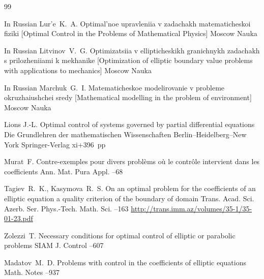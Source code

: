 \begin{thebibliography}{99}

\lang In Russian
\by Lur'e~K.~A.
\book Optimal'noe upravleniia v zadachakh matematicheskoi fiziki \rm [Optimal Control in the Problems of Mathematical Physics]
\publaddr Moscow
\publ Nauka


\lang In Russian
\by Litvinov~V.~G.
\book Optimizatsiia v ellipticheskikh granichnykh zadachakh s prilozheniiami k mekhanike \rm [Optimization of elliptic boundary value problems with applications to mechanics]
\publaddr Moscow
\publ Nauka

\lang In Russian
\by Marchuk~G.~I.
\book Matematicheskoe modelirovanie v probleme okruzhaiushchei sredy \rm [Mathematical modelling in the problem of environment]
\publaddr Moscow
\publ Nauka



\by Lions J.-L.
\book  Optimal control of systems governed by partial differential equations
\serial Die Grundlehren der mathematischen Wissenschaften
\publaddr Berlin--Heidelberg--New York
\publ Springer-Verlag
\totalpages xi+396~pp \nofrills
{}

\by Murat~F.
\paper Contre-exemples pour divers probl\`ems o\`u le contr\^ole intervient dans les coefficients
\jour Ann. Mat. Pura Appl.
--68


\by Tagiev~R.~K., Kasymova~R.~S.
\paper On an optimal problem for the coefficients of an elliptic equation a quality criterion of the boundary of domain 
\jour Trans. Acad. Sci. Azerb. Ser. Phys.-Tech. Math. Sci. 
--163
\elink \url{http://trans.imm.az/volumes/35-1/35-01-23.pdf}

\by Zolezzi~T.
\paper Necessary conditions for optimal control of elliptic or parabolic problems 
\jour SIAM J. Control
--607



\by Madatov~M.~D.
\paper Problems with control in the coefficients of elliptic equations
\jour Math. Notes
--937


\end{thebibliography}
